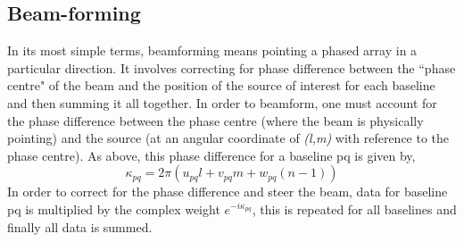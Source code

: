 \subsection{Beam-forming}
\label{sec:beamform_theory}
In its most simple terms, beamforming  means pointing a phased array in a particular direction. It involves correcting for phase difference between the ``phase centre" of the beam and the position of the source of interest for each baseline and then summing it all together. %
In order to beamform, one must account for the phase difference between the phase centre (where the beam is physically pointing) and the source (at an angular coordinate of \textit{(l,m)} with reference to the phase centre). As above, this phase difference for a baseline pq is given by, 
$$\kappa_{pq} = 2\pi(u_{pq}l+v_{pq}m+w_{pq}(n-1))$$
In order to correct for the phase difference and steer the beam, data for baseline pq is multiplied by the complex weight $e^{-i\kappa_{pq}}$, this is repeated for all baselines and finally all data is summed.